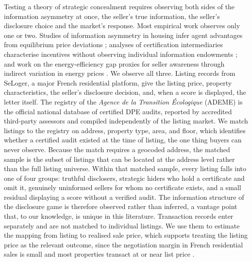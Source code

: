 Testing a theory of strategic concealment requires observing both sides of the information
asymmetry at once, the seller's true information, the seller's disclosure choice and the
market's response. Most empirical work observes only one or two. Studies of information
asymmetry in housing infer agent advantages from equilibrium price deviations
\citep{levitt_syverson_2008}; analyses of certification intermediaries characterise incentives
without observing individual information endowments \citep{lizzeri_1999}; and work on the
energy-efficiency gap proxies for seller awareness through indirect variation in energy prices
\citep{myers_asymmetric_2020}. We observe all three. Listing records from SeLoger, a major
French residential platform, give the listing price, property characteristics, the seller's
disclosure decision, and, when a score is displayed, the letter itself. The registry of the
\emph{Agence de la Transition \'Ecologique} (ADEME) is the official national database of
certified DPE audits, reported by accredited third-party assessors and compiled independently
of the listing market. We match listings to the registry on address, property type, area, and
floor, which identifies whether a certified audit existed at the time of listing, the one
thing buyers can never observe. Because the match requires a geocoded address, the matched
sample is the subset of listings that can be located at the address level rather than the full
listing universe. Within that matched sample, every listing falls into one of four groups: truthful
disclosers, strategic hiders who hold a certificate and omit it, genuinely uninformed
sellers for whom no certificate exists, and a small residual displaying a score without a
verified audit. The information structure of the disclosure game is therefore observed rather
than inferred, a vantage point that, to our knowledge, is unique in this literature. Transaction
records enter separately and are not matched to individual listings. We use them to estimate
the mapping from listing to realised sale price, which supports treating the listing price as
the relevant outcome, since the negotiation margin in French residential sales is small and
most properties transact at or near list price
\citep{merlo_bargaining_2004, genesove_loss_2001, friggit_marche_2013}.

